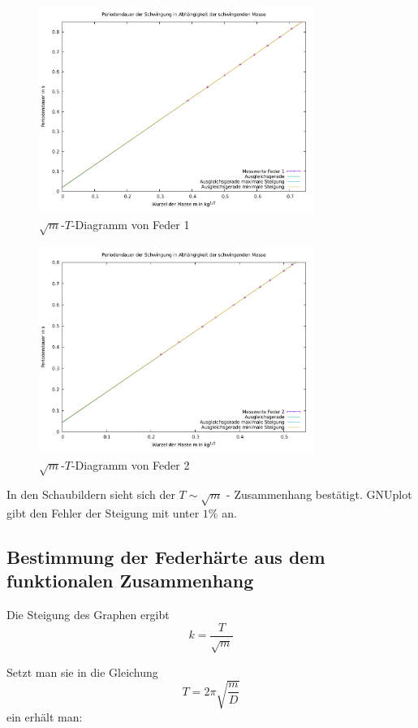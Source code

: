 \begin{figure}[H]
\centering
\includegraphics[width=0.8\textwidth]{data/spring1.pdf}
\caption{$\sqrt{m}$-$T$-Diagramm von Feder 1}
\end{figure}
\begin{figure}[H]
\centering
\includegraphics[width=0.8\textwidth]{data/spring2.pdf}
\caption{$\sqrt{m}$-$T$-Diagramm von Feder 2}
\end{figure}

In den Schaubildern sieht sich der $T \sim \sqrt{m}$ - Zusammenhang bestätigt.
GNUplot gibt den Fehler der Steigung mit unter $1\%$ an.

\subsection{Bestimmung der Federhärte aus dem funktionalen Zusammenhang}
Die Steigung des Graphen ergibt
$$k = \frac{T}{\sqrt{m}}$$

Setzt man sie in die Gleichung
$$T = 2\pi\sqrt{\frac{m}{D}}$$
ein erhält man:

